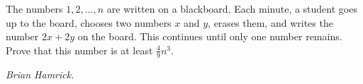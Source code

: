 The numbers $1, 2, \ldots, n$ are written on a blackboard. Each minute, a student goes up to the board, chooses two numbers $x$ and $y$, erases them, and writes the number $2x+2y$ on the board. This continues until only one number remains. Prove that this number is at least $\frac{4}{9}n^3$.

\textit{Brian Hamrick.}